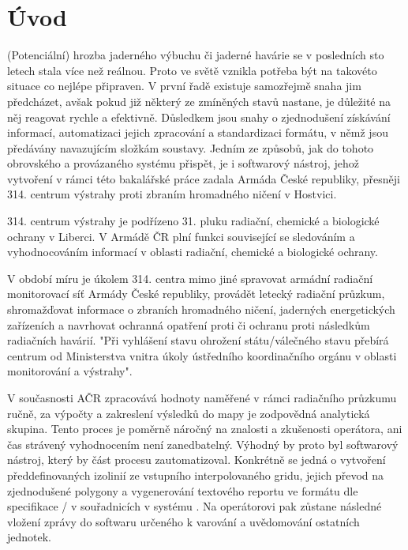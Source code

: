 \chapter{Úvod}
\label{1-uvod}

(Potenciální) hrozba jaderného výbuchu či jaderné havárie se v posledních sto letech stala více než reálnou. Proto ve světě vznikla potřeba být na takovéto situace co nejlépe připraven. V první řadě existuje samozřejmě snaha jim předcházet, avšak pokud již některý ze zmíněných stavů nastane, je důležité na něj reagovat rychle a efektivně. 
Důsledkem jsou snahy o zjednodušení získávání informací, automatizaci jejich zpracování a standardizaci formátu, v němž jsou předávány navazujícím složkám soustavy. Jedním ze způsobů, jak do tohoto obrovského a provázaného systému přispět, je i softwarový nástroj, jehož vytvoření v rámci této bakalářské práce zadala Armáda České republiky, přesněji 314. centrum výstrahy proti zbraním hromadného ničení v Hostvici.

314. centrum výstrahy  je podřízeno 31. pluku radiační, chemické a biologické ochrany v Liberci. V Armádě ČR plní funkci související se sledováním a vyhodnocováním informací v oblasti radiační, chemické a biologické ochrany.

V období míru je úkolem 314. centra mimo jiné spravovat armádní radiační monitorovací síť Armády České republiky, provádět letecký radiační průzkum, shromažďovat informace o zbraních hromadného ničení, jaderných energetických zařízeních a navrhovat ochranná opatření proti  či ochranu proti následkům radiačních havárií. "Při vyhlášení stavu ohrožení státu/válečného stavu přebírá centrum od Ministerstva vnitra úkoly ústředního koordinačního orgánu v oblasti monitorování a výstrahy". \cite{ZHN}

V současnosti AČR zpracovává hodnoty naměřené v rámci radiačního průzkumu ručně, za výpočty a zakreslení výsledků do mapy je zodpovědná analytická skupina. Tento proces je poměrně náročný na znalosti a zkušenosti operátora, ani čas strávený vyhodnocením není zanedbatelný. Výhodný by proto byl softwarový nástroj, který by část procesu zautomatizoval. Konkrétně se jedná o vytvoření předdefinovaných izolinií ze vstupního interpolovaného gridu, jejich převod na zjednodušené polygony a vygenerování textového reportu ve formátu dle specifikace / v souřadnicích v systému . Na operátorovi pak zůstane následné vložení zprávy do softwaru určeného k varování a uvědomování ostatních jednotek. 

